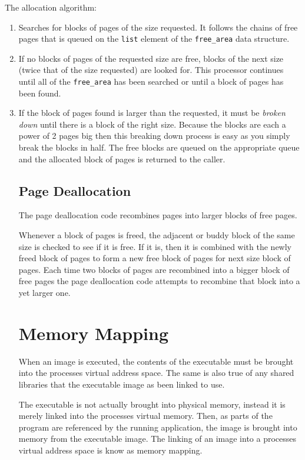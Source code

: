 \documentclass[a4paper,12pt]{book}
\begin{document}
The allocation algorithm:
\begin{enumerate}
\item Searches for blocks of pages of the size requested. It follows the chains
of free pages that is queued on the \verb|list| element of the \verb|free_area|
data structure.
\item If no blocks of pages of the requested size are free, blocks of the next
size (twice that of the size requested) are looked for. This processor
continues until all of the \verb|free_area| has been searched or until a block
of pages has been found. 
\item If the block of pages found is larger than the requested, it must be
\emph{broken down} until there is a block of the right size. Because the
blocks are each a power of 2 pages big then this breaking down process is easy
as you simply break the blocks in half. The free blocks are queued on the
appropriate queue and the allocated block of pages is returned to the caller.
\subsection{Page Deallocation}
The page deallocation code recombines pages into larger blocks of free pages. 

Whenever a block of pages is freed, the adjacent or buddy block of the same size
is checked to see if it is free. If it is, then it is combined with the newly
freed block of pages to form a new free block of pages for next size block of
pages. Each time two blocks of pages are recombined into a bigger block of free
pages the page deallocation code attempts   to recombine that block into a yet
larger one. 
\section{Memory Mapping}
When an image is executed, the contents of the executable must be brought into
the processes virtual address space. The same is also true of any shared
libraries that the executable image as been linked to use. 

The executable is not actually brought into physical memory, instead it is
merely linked into the processes virtual memory. Then, as parts of the program
are referenced by the running application, the image is brought into memory from
the executable image. The linking of an image into a processes virtual address
space is know as memory mapping.
\end{enumerate}
\end{document}
